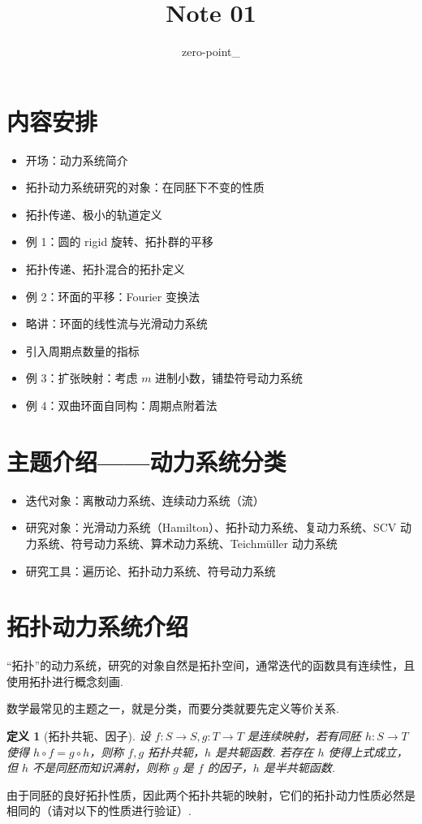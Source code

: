 \documentclass[11pt, a4paper, oneside]{ctexart}
\title{Note 01}
\author{zero-point\_}
\newtheorem{definition}[theorem]{定义}
\begin{document}
	\maketitle
    \section{内容安排}
    \begin{itemize}
        \item 开场：动力系统简介
        \item 拓扑动力系统研究的对象：在同胚下不变的性质
        \item 拓扑传递、极小的轨道定义
        \item 例 1：圆的 rigid 旋转、拓扑群的平移
        \item 拓扑传递、拓扑混合的拓扑定义
        \item 例 2：环面的平移：Fourier 变换法
        \item 略讲：环面的线性流与光滑动力系统
        \item 引入周期点数量的指标
        \item 例 3：扩张映射：考虑 $m$ 进制小数，铺垫符号动力系统
        \item 例 4：双曲环面自同构：周期点附着法
    \end{itemize}

    \section{主题介绍——动力系统分类}
    \begin{itemize}
        \item 迭代对象：离散动力系统、连续动力系统（流）
        \item 研究对象：光滑动力系统（Hamilton）、拓扑动力系统、复动力系统、SCV 动力系统、符号动力系统、算术动力系统、Teichmüller 动力系统
        \item 研究工具：遍历论、拓扑动力系统、符号动力系统
    \end{itemize}

    \section{拓扑动力系统介绍}
    “拓扑”的动力系统，研究的对象自然是拓扑空间，通常迭代的函数具有连续性，且使用拓扑进行概念刻画.

    数学最常见的主题之一，就是分类，而要分类就要先定义等价关系.
    \begin{definition}[拓扑共轭、因子]
        设 $f:S\to S,g:T\to T$ 是连续映射，若有同胚 $h:S\to T$ 使得 $h\circ f=g\circ h$，则称 $f,g$ 拓扑共轭，$h$ 是共轭函数. 若存在 $h$ 使得上式成立，但 $h$ 不是同胚而知识满射，则称 $g$ 是 $f$ 的因子，$h$ 是半共轭函数.
    \end{definition}
    由于同胚的良好拓扑性质，因此两个拓扑共轭的映射，它们的拓扑动力性质必然是相同的（请对以下的性质进行验证）.
\end{document}
